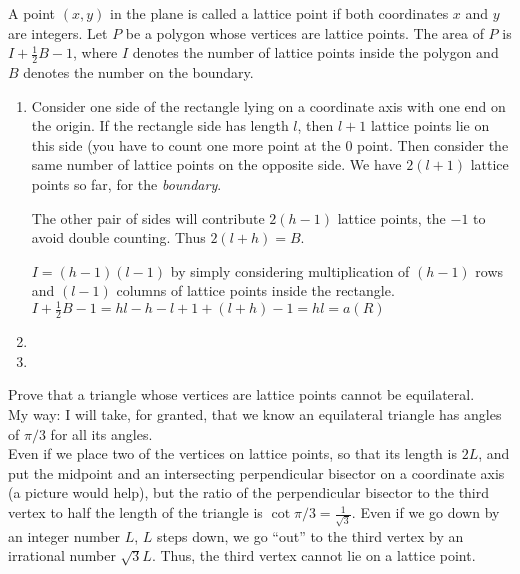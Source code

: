 \documentclass[twoside]{amsart}
\theoremstyle{plain}
\theoremstyle{definition}
\newcommand{\exercisehead}[1]
  {\smallskip
   \noindent{\small\bf Exercise #1.}}
\begin{document}
\exercisehead{4} A point $(x,y)$ in the plane is called a lattice point if both coordinates $x$ and $y$ are integers.  Let $P$ be a polygon whose vertices are lattice points.  The area of $P$ is $I + \frac{1}{2}B - 1$, where $I$ denotes the number of lattice points inside the polygon and $B$ denotes the number on the boundary.  
\begin{enumerate}
\item Consider one side of the rectangle lying on a coordinate axis with one end on the origin.  If the rectangle side has length $l$, then $l+1$ lattice points lie on this side (you have to count one more point at the $0$ point.  Then consider the same number of lattice points on the opposite side.  We have $2(l+1)$ lattice points so far, for the \emph{boundary}.  

The other pair of sides will contribute $2(h-1)$ lattice points, the $-1$ to avoid double counting.  Thus $2(l + h)=B$.  

$I= (h-1)(l-1)$ by simply considering multiplication of $(h-1)$ rows and $(l-1)$ columns of lattice points inside the rectangle.  \bigskip \\

$I + \frac{1}{2}B - 1 = hl - h - l + 1 + (l + h ) - 1 = hl = a(R)$
\item
\item 
\end{enumerate}

\exercisehead{5} Prove that a triangle whose vertices are lattice points cannot be equilateral. \bigskip \\

My way: I will take, for granted, that we know an equilateral triangle has angles of $\pi/3$ for all its angles.  \medskip \\
Even if we place two of the vertices on lattice points, so that its length is $2L$, and put the midpoint and an intersecting perpendicular bisector on a coordinate axis (a picture would help), but the ratio of the perpendicular bisector to the third vertex to half the length of the triangle is $\cot{\pi/3} = \frac{1}{\sqrt{3}}$.  Even if we go down by an integer number $L$, $L$ steps down, we go ``out'' to the third vertex by an irrational number $\sqrt{3}L$.  Thus, the third vertex cannot lie on a lattice point.  
\end{document}
